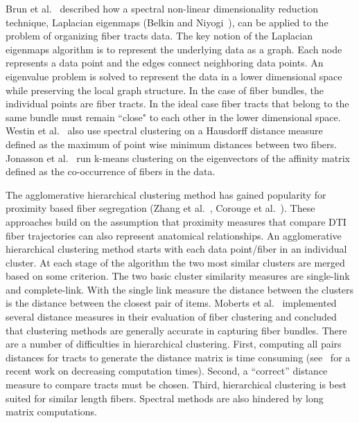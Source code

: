Brun et al.~\cite{Brun2003} described how a spectral non-linear dimensionality reduction technique,  Laplacian eigenmaps (Belkin and Niyogi~\cite{Belkin01}), can be applied to the problem of organizing fiber tracts data. The key notion of the Laplacian eigenmaps algorithm is to represent the underlying data as a graph. Each node represents a data point and the edges connect neighboring data points. An eigenvalue problem is solved to represent the data in a lower dimensional space while preserving the local graph structure. In the case of fiber bundles, the individual points are fiber tracts. In the ideal case fiber tracts that belong to the same bundle must remain ``close" to each other in the lower dimensional space. Westin et al.~\cite{westinMEDIA02} also use spectral clustering on a Hausdorff distance measure defined as the maximum of point wise minimum distances between two fibers. Jonasson et al.~\cite{jonasson2005} run k-means clustering on the eigenvectors of the affinity matrix defined as the co-occurrence of fibers in the data.

The agglomerative hierarchical clustering method \cite{DudaHartStork01} has gained popularity for proximity based fiber segregation (Zhang et al.~\cite{Zhang2008}, Corouge et al.~\cite{Corouge2004}). 
These approaches build on the assumption that proximity measures that compare DTI fiber trajectories can also represent anatomical relationships. An agglomerative hierarchical clustering method starts with each data point/fiber in an individual cluster. At each stage of the algorithm the two most similar clusters are merged based on some criterion. The two basic cluster similarity measures are single-link and complete-link. With the single link measure the distance between the clusters is the distance between the closest pair of items. 
Moberts et al.~\cite{Moberts2005} implemented several distance measures in their evaluation of fiber clustering and concluded that clustering methods are generally accurate in capturing fiber bundles. 
There are a number of difficulties in hierarchical clustering. First, computing all pairs distances for tracts to generate the distance matrix is time consuming (see~\cite{Garyfallidis2012} for a recent work on decreasing computation times). Second, a ``correct'' distance measure to compare tracts must be chosen. Third, hierarchical clustering is best suited for similar length fibers.
Spectral methods are also hindered by long matrix computations.


